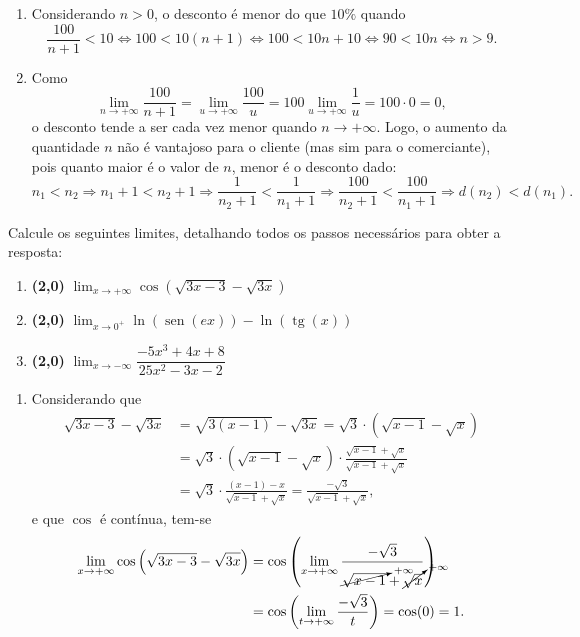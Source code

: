 \documentclass[12pt,a4paper]{article}
\newcommand*\sen{\operatorname{sen}}
\newcommand*\tg{\operatorname{tg}}
\begin{document}
\begin{ExerciseList}
\Answer
\begin{enumerate}
\item Considerando $n > 0$, o desconto é menor do que $10\%$ quando
\[
\frac{100}{n+1} < 10
\Leftrightarrow
100 < 10(n+1)
\Leftrightarrow
100 < 10n + 10
\Leftrightarrow
90 < 10n
\Leftrightarrow
n > 9.
\]

\item Como
\[
\lim_{n \to +\infty} \frac{100}{n+1}
= \lim_{u \to +\infty} \frac{100}{u}
= 100 \lim_{u \to +\infty} \frac{1}{u}
= 100 \cdot 0 = 0,
\]
o desconto tende a ser cada vez menor quando $n \to +\infty$. Logo, o aumento da quantidade $n$ não é vantajoso para o cliente (mas sim para o comerciante), pois quanto maior é o valor de $n$, menor é o desconto dado:
\[
n_1 < n_2
\Rightarrow
n_1+1 < n_2+1
\Rightarrow
\frac{1}{n_2+1} < \frac{1}{n_1+1}
\Rightarrow
\frac{100}{n_2+1} < \frac{100}{n_1+1}
\Rightarrow
d(n_2) < d(n_1).
\]
\end{enumerate}

\Exercise Calcule os seguintes limites, detalhando todos os passos necessários para obter a resposta:
\begin{multicols}{2}
\begin{enumerate}
\item \textbf{(2,0)} $\displaystyle\lim_{ x \to +\infty } \cos\left(\sqrt{3x-3}-\sqrt{3x}\right) $
\item \textbf{(2,0)} $\displaystyle\lim_{ x \to 0^+ } \ln( \sen(e x) ) - \ln(\tg(x)) $
\item \textbf{(2,0)} $\displaystyle\lim_{ x \to -\infty } \dfrac{ -5x^3 + 4x + 8}{25x^2-3x-2}$
\end{enumerate}
\end{multicols}
\Answer
\begin{enumerate}
\item Considerando que
\begin{align*}
\sqrt{3x-3}-\sqrt{3x}
& = \sqrt{3(x-1)} - \sqrt{3x}
  = \sqrt{3} \cdot
    \left( \sqrt{x - 1} - \sqrt{x}\right)\\
& = \sqrt{3} \cdot
    \left( \sqrt{x - 1} - \sqrt{x}\right) \cdot
    \frac{ \sqrt{x-1}+\sqrt{x} }
         { \sqrt{x-1}+\sqrt{x} }\\
& = \sqrt{3} \cdot
    \frac{ (x - 1) - x }
         { \sqrt{x-1}+\sqrt{x} }
 = \frac{ -\sqrt{3} }
        { \sqrt{x-1}+\sqrt{x} },
\end{align*}
e que $\cos$ é contínua, tem-se
\begin{align*}
\lim_{ x \to +\infty } \cos\left(\sqrt{3x-3}-\sqrt{3x}\right)
& = \cos \left( \lim_{ x \to +\infty }
  \frac{ -\sqrt{3} }
       { \cancelto{+\infty}{\sqrt{x-1}}+\cancelto{+\infty}{\sqrt{x}} } \right) \\
& = \cos \left( \lim_{ t \to +\infty }
  \frac{ -\sqrt{3} }
       { t } \right)
= \cos(0) = 1.
\end{align*}


\end{enumerate}
\end{ExerciseList}
\end{document}
